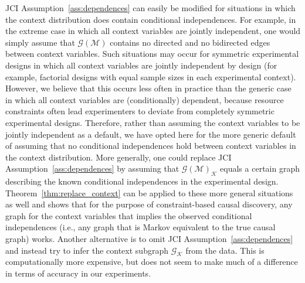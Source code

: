 \documentclass[twoside,11pt]{article}
\newcommand{\Prb}{\mathbb{P}}
\newcommand\C[1]{\mathcal{#1}}
\newcommand{\Joris}[1]{{\color{blue}#1}}
\newcommand{\Sara}[1]{{\color{purple}#1}}
\newcommand{\Tom}[1] {{\color{green}#1}}
\begin{document}
JCI Assumption~\ref{ass:dependences} can easily be modified for situations in which the context distribution does contain
conditional independences. For example, in the extreme case in which all context variables are jointly independent,
one would simply assume that $\C{G}(\C{M})$ contains no directed and no bidirected edges between context variables. 
Such situations may occur for symmetric experimental designs in which all context variables are jointly independent by design (for example, factorial designs with equal sample sizes in each experimental context). However, we believe that this occurs less often in practice than the generic case in which all context variables are (conditionally) dependent, because resource constraints often lead experimenters to deviate from completely symmetric experimental designs. Therefore, rather than assuming the context variables to be jointly independent as a default, we have opted here for the more generic default of assuming that no conditional independences hold between context variables in the context distribution. 
More generally, one could replace JCI Assumption~\ref{ass:dependences} by assuming that $\C{G}(\C{M})_\C{K}$ equals
a certain graph describing the known conditional independences in the experimental design.
Theorem~\ref{thm:replace_context} can be applied to these more general situations as well and shows
that for the purpose of constraint-based causal discovery, any graph for the context
variables that implies the observed conditional independences (i.e., any graph that is Markov 
equivalent to the true causal graph) works.
Another alternative is to omit JCI Assumption~\ref{ass:dependences}
and instead try to infer the context subgraph $\C{G}_{\C{K}}$ from the data. This is
computationally more expensive, but does not seem to make much of a difference
in terms of accuracy in our experiments.%

\end{document}

